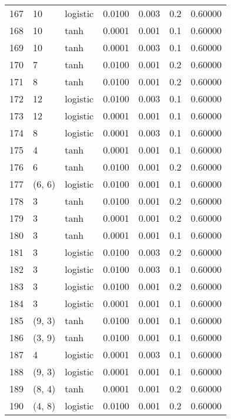 \begin{tabular}{lllrrrr}
167 &          10 &  logistic &  0.0100 &  0.003 &  0.2 &   0.60000 \\
168 &          10 &      tanh &  0.0001 &  0.001 &  0.1 &   0.60000 \\
169 &          10 &      tanh &  0.0001 &  0.003 &  0.1 &   0.60000 \\
170 &           7 &      tanh &  0.0100 &  0.001 &  0.2 &   0.60000 \\
171 &           8 &      tanh &  0.0100 &  0.001 &  0.2 &   0.60000 \\
172 &          12 &  logistic &  0.0100 &  0.003 &  0.1 &   0.60000 \\
173 &          12 &  logistic &  0.0001 &  0.001 &  0.1 &   0.60000 \\
174 &           8 &  logistic &  0.0001 &  0.003 &  0.1 &   0.60000 \\
175 &           4 &      tanh &  0.0001 &  0.001 &  0.1 &   0.60000 \\
176 &           6 &      tanh &  0.0100 &  0.001 &  0.2 &   0.60000 \\
177 &      (6, 6) &  logistic &  0.0100 &  0.001 &  0.1 &   0.60000 \\
178 &           3 &      tanh &  0.0100 &  0.001 &  0.2 &   0.60000 \\
179 &           3 &      tanh &  0.0001 &  0.001 &  0.2 &   0.60000 \\
180 &           3 &      tanh &  0.0001 &  0.001 &  0.1 &   0.60000 \\
181 &           3 &  logistic &  0.0100 &  0.003 &  0.2 &   0.60000 \\
182 &           3 &  logistic &  0.0100 &  0.003 &  0.1 &   0.60000 \\
183 &           3 &  logistic &  0.0100 &  0.001 &  0.2 &   0.60000 \\
184 &           3 &  logistic &  0.0001 &  0.001 &  0.1 &   0.60000 \\
185 &      (9, 3) &      tanh &  0.0100 &  0.001 &  0.1 &   0.60000 \\
186 &      (3, 9) &      tanh &  0.0100 &  0.001 &  0.1 &   0.60000 \\
187 &           4 &  logistic &  0.0001 &  0.003 &  0.1 &   0.60000 \\
188 &      (9, 3) &  logistic &  0.0001 &  0.001 &  0.1 &   0.60000 \\
189 &      (8, 4) &      tanh &  0.0001 &  0.001 &  0.2 &   0.60000 \\
190 &      (4, 8) &  logistic &  0.0100 &  0.001 &  0.2 &   0.60000 \\

\end{tabular}
